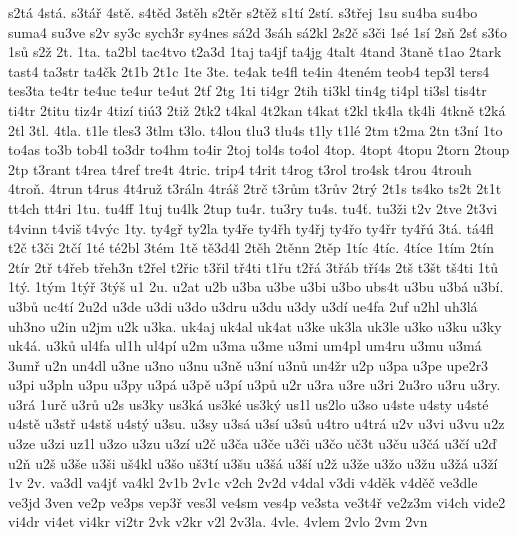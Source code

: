 {s2t\'a
4st\'a.
s3t\'a\v r
4st\v e.
s4t\v ed
3st\v eh
s2t\v er
s2t\v e\v z
s1t\'i
2st\'i.
s3t\v rej
1su
su4ba
su4bo
suma4
su3ve
s2v
sy3c
sych3r
sy4nes
s\'a2d
3s\'ah
s\'a2kl
2s2\v c
s3\v ci
1s\'e
1s\'i
2s\v n
2s\v t
s3\v to
1s\r u
s2\v z
2t.
1ta.
ta2bl
tac4tvo
t2a3d
1taj
ta4jf
ta4jg
4talt
4tand
3tan\v e
t1ao
2tark
tast4
ta3str
ta4\v ck
2t1b
2t1c
1te
3te.
te4ak
te4fl
te4in
4ten\'em
teob4
tep3l
ters4
tes3ta
te4tr
te4uc
te4ur
te4ut
2tf
2tg
1ti
ti4gr
2tih
ti3kl
tin4g
ti4pl
ti3sl
tis4tr
ti4tr
2titu
tiz4r
4tiz\'i
ti\'u3
2ti\v z
2tk2
t4kal
4t2kan
t4kat
t2kl
tk4la
tk4li
4tkn\v e
t2k\'a
2tl
3tl.
4tla.
t1le
tles3
3tlm
t3lo.
t4lou
tlu3
tlu4s
t1ly
t1l\'e
2tm
t2ma
2tn
t3n\'i
1to
to4as
to3b
tob4l
to3dr
to4hm
to4ir
2toj
tol4s
to4ol
4top.
4topt
4topu
2torn
2toup
2tp
t3rant
t4rea
t4ref
tre4t
4tric.
trip4
t4rit
t4rog
t3rol
tro4sk
t4rou
4trouh
4tro\v n.
4trun
t4rus
4t4ru\v z
t3r\'aln
4tr\'a\v s
2tr\v c
t3r\r um
t3r\r uv
2tr\'y
2t1s
ts4ko
ts2t
2t1t
tt4ch
tt4ri
1tu.
tu4ff
1tuj
tu4lk
2tup
tu4r.
tu3ry
tu4s.
tu4\v t.
tu3\v zi
t2v
2tve
2t3vi
t4vinn
t4vi\v s
t4v\'yc
1ty.
ty4g\v r
ty2la
ty4\v re
ty4\v rh
ty4\v rj
ty4\v ro
ty4\v rr
ty4\v r\'u
3t\'a.
t\'a4fl
t2\v c
t3\v ci
2t\v c\'i
1t\'e
t\'e2bl
3t\'em
1t\v e
t\v e3d4l
2t\v eh
2t\v enn
2t\v ep
1t\'ic
4t\'ic.
4t\'ice
1t\'im
2t\'in
2t\'ir
2t\v r
t4\v reb
t\v reh3n
t2\v rel
t2\v ric
t3\v ril
t\v r4ti
t1\v ru
t2\v r\'a
3t\v r\'ab
t\v r\'i4s
2t\v s
t3\v st
t\v s4ti
1t\r u
1t\'y.
1t\'ym
1t\'y\v r
3t\'y\v s
u1
2u.
u2at
u2b
u3ba
u3be
u3bi
u3bo
ubs4t
u3bu
u3b\'a
u3b\'i.
u3b\r u
uc4t\'i
2u2d
u3de
u3di
u3do
u3dru
u3du
u3dy
u3d\'i
ue4fa
2uf
u2hl
uh3l\'a
uh3no
u2in
u2jm
u2k
u3ka.
uk4aj
uk4al
uk4at
u3ke
uk3la
uk3le
u3ko
u3ku
u3ky
uk4\'a.
u3k\r u
ul4fa
ul1h
ul4p\'i
u2m
u3ma
u3me
u3mi
um4pl
um4ru
u3mu
u3m\'a
3um\v r
u2n
un4dl
u3ne
u3no
u3nu
u3n\v e
u3n\'i
u3n\r u
un4\v zr
u2p
u3pa
u3pe
upe2r3
u3pi
u3pln
u3pu
u3py
u3p\'a
u3p\v e
u3p\'i
u3p\r u
u2r
u3ra
u3re
u3ri
2u3ro
u3ru
u3ry.
u3r\'a
1ur\v c
u3r\r u
u2s
us3ky
us3k\'a
us3k\'e
us3k\'y
us1l
us2lo
u3so
u4ste
u4sty
u4st\'e
u4st\v e
u3st\v r
u4st\v s
u4st\'y
u3su.
u3sy
u3s\'a
u3s\'i
u3s\r u
u4tro
u4tr\'a
u2v
u3vi
u3vu
u2z
u3ze
u3zi
uz1l
u3zo
u3zu
u3z\'i
u2\v c
u3\v ca
u3\v ce
u3\v ci
u3\v co
u\v c3t
u3\v cu
u3\v c\'a
u3\v c\'i
u2\v d
u2\v n
u2\v s
u3\v se
u3\v si
u\v s4kl
u3\v so
u\v s3t\'i
u3\v su
u3\v s\'a
u3\v s\'i
u2\v z
u3\v ze
u3\v zo
u3\v zu
u3\v z\'a
u3\v z\'i
1v
2v.
va3dl
va4j\v t
va4kl
2v1b
2v1c
v2ch
2v2d
v4dal
v3di
v4d\v ek
v4d\v e\v c
ve3dle
ve3jd
3ven
ve2p
ve3ps
vep3\v r
ves3l
ve4sm
ves4p
ve3sta
ve3t4\v r
ve2z3m
vi4ch
vide2
vi4dr
vi4et
vi4kr
vi2tr
2vk
v2kr
v2l
2v3la.
4vle.
4vlem
2vlo
2vm
2vn
}
